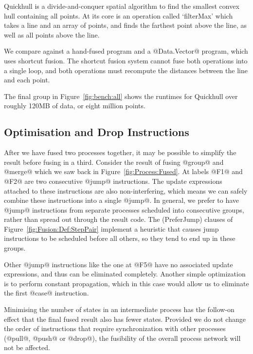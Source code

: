 Quickhull is a divide-and-conquer spatial algorithm to find the smallest convex hull containing all points.
At its core is an operation called `filterMax' which takes a line and an array of points, and finds the farthest point above the line, as well as all points above the line.

We compare against a hand-fused program and a @Data.Vector@ program, which uses shortcut fusion.
The shortcut fusion system cannot fuse both operations into a single loop, and both operations must recompute the distances between the line and each point.

The final group in Figure~\ref{fig:bench:all} shows the runtimes for Quickhull over roughly 120MB of data, or eight million points.


\subsection{Optimisation and Drop Instructions}
\label{s:Optimisation}
After we have fused two processes together, it may be possible to simplify the result before fusing in a third. Consider the result of fusing @group@ and @merge@ which we saw back in Figure~\ref{fig:Process:Fused}. At labels @F1@ and @F2@ are two consecutive @jump@ instructions. The update expressions attached to these instructions are also non-interfering, which means we can safely combine these instructions into a single @jump@. In general, we prefer to have @jump@ instructions from separate processes scheduled into consecutive groups, rather than spread out through the result code. The (PreferJump) clauses of Figure~\ref{fig:Fusion:Def:StepPair} implement a heuristic that causes jump instructions to be scheduled before all others, so they tend to end up in these groups.

Other @jump@ instructions like the one at @F5@ have no associated update expressions, and thus can be eliminated completely. Another simple optimization is to perform constant propagation, which in this case would allow us to eliminate the first @case@ instruction. 

Minimising the number of states in an intermediate process has the follow-on effect that the final fused result also has fewer states. Provided we do not change the order of instructions that require synchronization with other processes (@pull@, @push@ or @drop@), the fusibility of the overall process network will not be affected.

